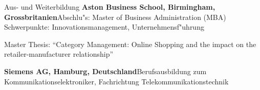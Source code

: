 \begin{rubric}{Aus- und Weiterbildung}
\entry*[10/1999--10/2000] \textbf{Aston Business School, Birmingham, Grossbritanien}\newline Abschlu"s: Master of Business Administration (MBA) \newline Schwerpunkte: 
Innovationsmanagement, Unternehmensf"uhrung

Master Thesis: ``Category Management: Online Shopping and the impact on the retailer-manufacturer relationship''


\entry*[08/1991--02/1995] \textbf{Siemens AG, Hamburg, Deutschland}\newline Berufsausbildung zum Kommunikationselektroniker, Fachrichtung Telekommunikationstechnik

\end{rubric}
